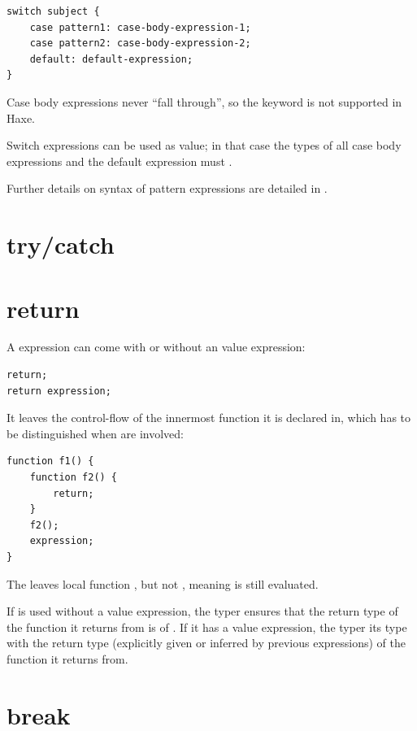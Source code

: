 \documentclass{haxe}
\begin{document}
\begin{lstlisting}
switch subject {
	case pattern1: case-body-expression-1;
	case pattern2: case-body-expression-2;
	default: default-expression;
}
\end{lstlisting}

Case body expressions never ``fall through'', so the  keyword is not supported in Haxe.

Switch expressions can be used as value; in that case the types of all case body expressions and the default expression must .

Further details on syntax of pattern expressions are detailed in .

\section{try/catch}
\label{expression-try-catch}

\section{return}
\label{expression-return}

A  expression can come with or without an value expression:

\begin{lstlisting}
return;
return expression;
\end{lstlisting}

It leaves the control-flow of the innermost function it is declared in, which has to be distinguished when  are involved:

\begin{lstlisting}
function f1() {
	function f2() {
		return;
	}
	f2();
	expression;
}
\end{lstlisting}

The  leaves local function , but not , meaning  is still evaluated.

If  is used without a value expression, the typer ensures that the return type of the function it returns from is of . If it has a value expression, the typer  its type with the return type (explicitly given or inferred by previous  expressions) of the function it returns from.


\section{break}
\label{expression-break}
\end{document}
